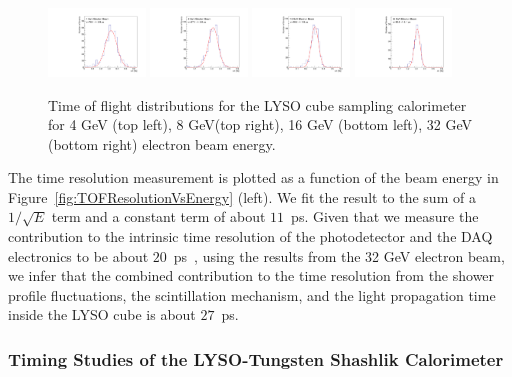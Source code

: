 \begin{figure}[ht!] \centering
\includegraphics[width=0.23\textwidth]{figs/TOF_Electron_LYSOCube_4GeV} 
\includegraphics[width=0.23\textwidth]{figs/TOF_Electron_LYSOCube_8GeV} 
\includegraphics[width=0.23\textwidth]{figs/TOF_Electron_LYSOCube_16GeV} 
\includegraphics[width=0.23\textwidth]{figs/TOF_Electron_LYSOCube_32GeV} 
\caption{ \small Time of flight distributions for the LYSO cube sampling calorimeter
for 4 GeV (top left), 8 GeV(top right), 16 GeV (bottom left),  32 GeV (bottom right) electron beam energy. } 
\label{fig:LYSOCubeTOF}
\end{figure}

The time resolution measurement is plotted as a function of the
beam energy in Figure~\ref{fig:TOFResolutionVsEnergy} (left). We fit the result to the sum of a 
$1/\sqrt{E}$ term and a constant term of about $11$~ps.   Given that we measure the contribution 
to the intrinsic time resolution of the photodetector and the DAQ electronics to be about 
$20$~ps~\cite{MCPFastCaloNIMA}, using the results from the 32 GeV electron beam, we infer 
that the combined contribution to the time resolution from the shower profile
fluctuations, the scintillation mechanism, and the light propagation time inside the
LYSO cube is about $27$~ps.  

\subsubsection{Timing Studies of the LYSO-Tungsten Shashlik Calorimeter}
